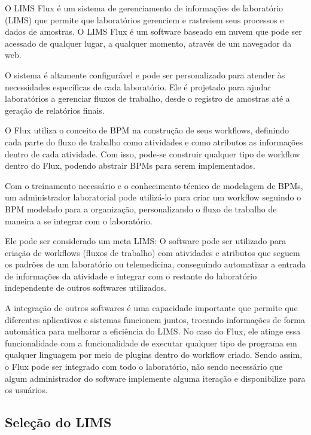 
O LIMS Flux é um sistema de gerenciamento de informações de laboratório (LIMS) que permite que laboratórios gerenciem e rastreiem seus processos e dados de amostras. O LIMS Flux é um software baseado em nuvem que pode ser acessado de qualquer lugar, a qualquer momento, através de um navegador da web.

O sistema é altamente configurável e pode ser personalizado para atender às necessidades específicas de cada laboratório. Ele é projetado para ajudar laboratórios a gerenciar fluxos de trabalho, desde o registro de amostras até a geração de relatórios finais.

O Flux utiliza o conceito de BPM na construção de seus workflows, definindo cada parte do fluxo de trabalho como atividades e como atributos as informações dentro de cada atividade. Com isso, pode-se construir qualquer tipo de workflow dentro do Flux, podendo abstrair BPMs para serem implementados.

Com o treinamento necessário e o conhecimento técnico de modelagem de BPMs, um administrador laboratorial pode utilizá-lo para criar um workflow seguindo o BPM modelado para a organização, personalizando o fluxo de trabalho de maneira a se integrar com o laboratório.

Ele pode ser considerado um meta LIMS: O software pode ser utilizado para criação de workflows (fluxos de trabalho) com atividades e atributos que seguem os padrões de um laboratório ou telemedicina, conseguindo automatizar a entrada de informações da atividade e integrar com o restante do laboratório independente de outros softwares utilizados.

A integração de outros softwares é uma capacidade importante que permite que diferentes aplicativos e sistemas funcionem juntos, trocando informações de forma automática para melhorar a eficiência do LIMS. No caso do Flux, ele atinge essa funcionalidade com a funcionalidade de executar qualquer tipo de programa em qualquer linguagem por meio de plugins dentro do workflow criado.
Sendo assim, o Flux pode ser integrado com todo o laboratório, não sendo necessário que algum administrador do software implemente alguma iteração e disponibilize para os usuários.


\subsection{Seleção do LIMS}

